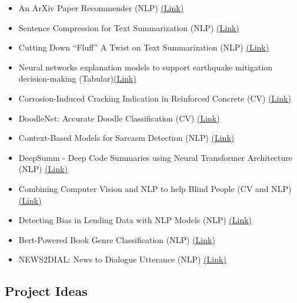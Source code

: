 \documentclass[11pt]{article}
\theoremstyle{definition}
\begin{document}
\begin{itemize}
  \item An ArXiv Paper Recommender (NLP) \href{https://cs230.stanford.edu/projects_winter_2021/reports/70758899.pdf}{(Link)}
  \item Sentence Compression for Text Summarization (NLP) \href{https://cs230.stanford.edu/projects_spring_2020/reports/38960080.pdf}{(Link)}
  \item Cutting Down “Fluff” A Twist on Text Summarization (NLP) \href{https://cs230.stanford.edu/projects_fall_2019/reports/26259895.pdf}{(Link)}
  \item Neural networks explanation models to support earthquake mitigation decision-making (Tabular)\href{https://cs230.stanford.edu/projects_fall_2021/reports/102891590.pdf}{(Link)}
  \item Corrosion-Induced Cracking Indication in Reinforced Concrete (CV) \href{https://cs230.stanford.edu/projects_fall_2022/reports/66.pdf}{(Link)}
  \item DoodleNet: Accurate Doodle Classification (CV) \href{https://cs230.stanford.edu/projects_fall_2018/reports/12448503.pdf}{(Link)}
  \item  Context-Based Models for Sarcasm Detection (NLP) \href{https://web.stanford.edu/class/archive/cs/cs224n/cs224n.1204/reports/custom/report02.pdf}{(Link)}
  \item  DeepSumm - Deep Code Summaries using Neural
Transformer Architecture (NLP) \href{https://web.stanford.edu/class/archive/cs/cs224n/cs224n.1204/reports/custom/report10.pdf}{(Link)}
  \item Combining Computer Vision and NLP to help Blind People (CV and NLP)\href{https://web.stanford.edu/class/archive/cs/cs224n/cs224n.1204/reports/custom/report27.pdf}{(Link)}
  \item Detecting Bias in Lending Data with NLP Models (NLP) \href{https://web.stanford.edu/class/archive/cs/cs224n/cs224n.1204/reports/custom/report23.pdf}{(Link)}
  \item Bert-Powered Book Genre Classification (NLP) \href{https://web.stanford.edu/class/cs224n/final-reports/final-report-169280003.pdf}{(Link)}
  \item NEWS2DIAL: News to Dialogue Utterance (NLP) \href{https://web.stanford.edu/class/cs224n/final-reports/final-report-169966375.pdf}{(Link)}
\end{itemize}

\subsection{Project Ideas}
\end{document}
